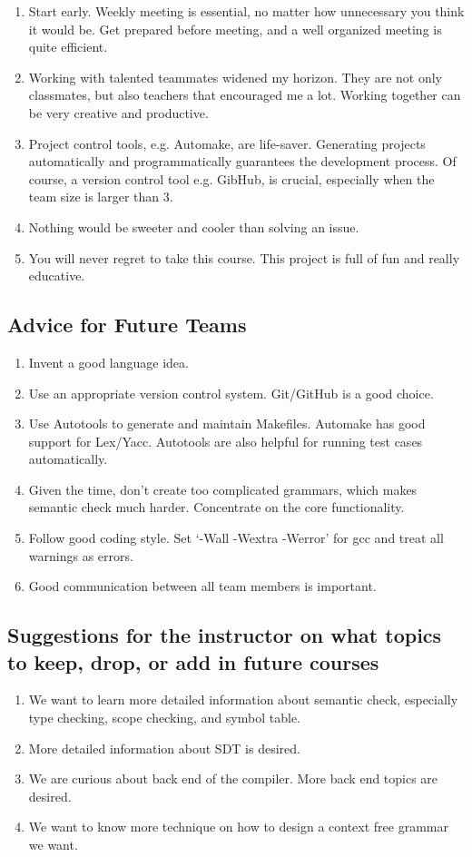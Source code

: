 \begin{enumerate}
\item
    Start early. Weekly meeting is essential, no matter how unnecessary you think it would
	be. Get prepared before meeting, and a well organized meeting is quite efficient.
\item
	    Working with talented teammates widened my horizon. They are not only classmates, but
		also teachers that encouraged me a lot. Working together can be very creative and
		productive.
\item
		Project control tools, e.g. Automake, are life-saver. Generating projects
		automatically and programmatically guarantees the development process. Of course, a
		version control tool e.g. GibHub, is crucial, especially when the team size is larger
		than 3.
\item
		Nothing would be sweeter and cooler than solving an issue. 
\item
		You will never regret to take this course. This project is full of fun and really
		educative.
\end{enumerate}

\subsection{Advice for Future Teams}

\begin{enumerate}
\item
Invent a good language idea.
\item
Use an appropriate version control system. Git/GitHub is a good choice.
\item
Use Autotools to generate and maintain Makefiles. Automake has good support for
Lex/Yacc. Autotools are also helpful for running test cases automatically.
\item
Given the time, don’t create too complicated grammars, which makes semantic check
much harder. Concentrate on the core functionality.
\item
Follow good coding style. Set ‘-Wall -Wextra -Werror’ for gcc and treat all warnings
as errors.
\item
Good communication between all team members is important.
\end{enumerate}

\subsection{Suggestions for the instructor on what topics to keep, drop, or add in future
courses}

\begin{enumerate}
\item
We want to learn more detailed information about semantic check, especially type
checking, scope checking, and symbol table.
\item
More detailed information about SDT is desired.
\item
We are curious about back end of the compiler. More back end topics are desired.
\item
We want to know more technique on how to design a context free grammar we want.
\end{enumerate}
